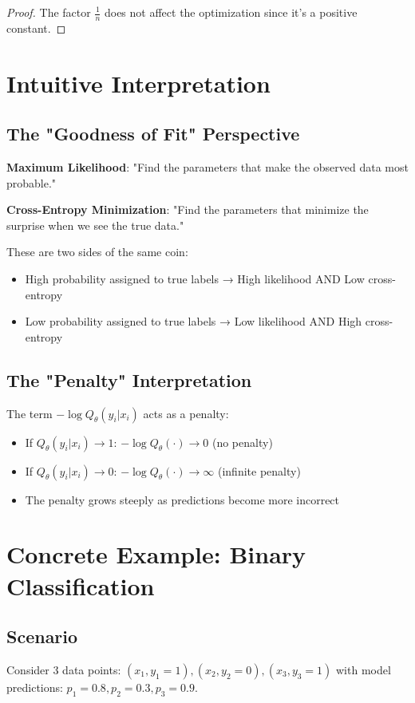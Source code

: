 \begin{notechapter}
\begin{proof}
The factor $\frac{1}{n}$ does not affect the optimization since it's a positive constant.
\end{proof}

\section{Intuitive Interpretation}

\subsection{The "Goodness of Fit" Perspective}

\textbf{Maximum Likelihood}: "Find the parameters that make the observed data most probable."

\textbf{Cross-Entropy Minimization}: "Find the parameters that minimize the surprise when we see the true data."

These are two sides of the same coin:
\begin{itemize}
    \item High probability assigned to true labels → High likelihood AND Low cross-entropy
    \item Low probability assigned to true labels → Low likelihood AND High cross-entropy
\end{itemize}

\subsection{The "Penalty" Interpretation}

The term $-\log Q_\theta(y_i | x_i)$ acts as a penalty:
\begin{itemize}
    \item If $Q_\theta(y_i | x_i) \to 1$: $-\log Q_\theta(\cdot) \to 0$ (no penalty)
    \item If $Q_\theta(y_i | x_i) \to 0$: $-\log Q_\theta(\cdot) \to \infty$ (infinite penalty)
    \item The penalty grows steeply as predictions become more incorrect
\end{itemize}

\section{Concrete Example: Binary Classification}

\subsection{Scenario}
Consider 3 data points: $(x_1, y_1=1), (x_2, y_2=0), (x_3, y_3=1)$ with model predictions: $p_1 = 0.8, p_2 = 0.3, p_3 = 0.9$.


\end{notechapter}
